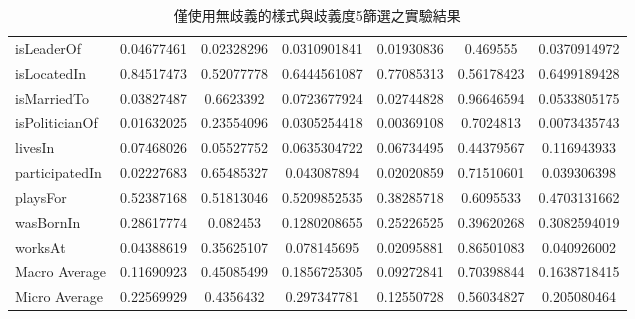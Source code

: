 \begin{table}
\begin{center}
\begin{tabular}{|l||c|c|c||c|c|c|}
        isLeaderOf & 0.04677461 & 0.02328296 & 0.0310901841 & 0.01930836 & 0.469555 & 0.0370914972\\
        isLocatedIn & 0.84517473 & 0.52077778 & 0.6444561087 & 0.77085313 & 0.56178423 & 0.6499189428\\
        isMarriedTo & 0.03827487 & 0.6623392 & 0.0723677924 & 0.02744828 & 0.96646594 & 0.0533805175\\
        isPoliticianOf & 0.01632025 & 0.23554096 & 0.0305254418 & 0.00369108 & 0.7024813 & 0.0073435743\\
        livesIn & 0.07468026 & 0.05527752 & 0.0635304722 & 0.06734495 & 0.44379567 & 0.116943933\\
        participatedIn & 0.02227683 & 0.65485327 & 0.043087894 & 0.02020859 & 0.71510601 & 0.039306398\\
        playsFor & 0.52387168 & 0.51813046 & 0.5209852535 & 0.38285718 & 0.6095533 & 0.4703131662\\
        wasBornIn & 0.28617774 & 0.082453 & 0.1280208655 & 0.25226525 & 0.39620268 & 0.3082594019\\
        worksAt & 0.04388619 & 0.35625107 & 0.078145695 & 0.02095881 & 0.86501083 & 0.040926002\\
        \hline
        Macro Average & 0.11690923 & 0.45085499 & 0.1856725305 & 0.09272841 & 0.70398844 & 0.1638718415\\
        Micro Average & 0.22569929 & 0.4356432 & 0.297347781 & 0.12550728 & 0.56034827 & 0.205080464\\
        \hline
        \end{tabular}
        \caption{僅使用無歧義的樣式與歧義度5篩選之實驗結果}
        \label{t:baseline-1}
    \end{center}
\end{table}
